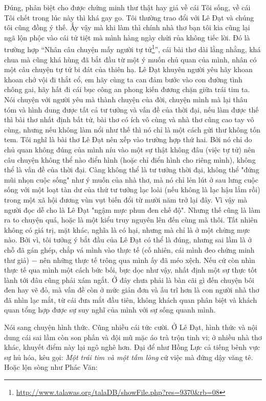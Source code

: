 \documentclass[../main.tex]{subfiles}
\begin{document}
\begin{multicols}{2}
Đúng, phân biệt cho được chứng minh thư thật hay giả về cái Tôi sống, về cái Tôi chết trong lúc này thì khá gay go. Tôi thường trao đổi với Lê Đạt và chúng tôi cũng đồng ý thế. Ấy vậy mà khi làm thì chính nhà thơ bạn tôi kia cũng lại ngã lộn phộc vào cái tử tiệt mà mình hàng ngày chửi rủa không tiếc lời. Đó là trường hợp “Nhân câu chuyện mấy người tự tử\footnote{\url{http://www.talawas.org/talaDB/showFile.php?res=9370&rb=08}}”, cái bài thơ dài lằng nhằng, khá chua mà cũng khá hùng đã bắt đầu từ một ý muốn chủ quan của mình, nhân có một câu chuyện tự tử bi đát của thiên hạ. Lê Đạt khuyên người yêu hãy khoan khoan chớ vội đi thắt cổ, em hãy cùng ta can đảm bước vào con đường tình chông gai, hãy hất đi cái bục công an phong kiến đương chặn giữa trái tim ta. Nói chuyện với người yêu mà thành chuyện của đời, chuyện mình mà lại thâu tóm và hình dung được tất cả tư tưởng và vấn đề của thời đại, nếu làm được thế thì bài thơ nhất định bất tử, bài thơ có ích vô cùng và nhà thơ cũng cao tay vô cùng, nhưng nếu không làm nổi như thế thì nó chỉ là một cách gửi thư không tốn tem. Tôi nghĩ là bài thơ Lê Đạt nên xếp vào trường hợp thứ hai. Bởi nó chỉ do chủ quan không đúng của mình níu vào một sự thật không đâu (việc tự tử) nên câu chuyện không thể nào điển hình (hoặc chỉ điển hình cho riêng mình), không thể là vấn đề của thời đại. Càng không thể là tư tưởng thời đại, không thể "đứng mũi nhọn cuộc sống" như ý muốn của nhà thơ, mà nó chỉ lẻn lút ở sau lưng cuộc sống với một loạt tàn dư của thứ tư tưởng lạc loài (nếu không là lạc hậu lắm rồi) trong một xã hội đương vùn vụt biến đổi từ mười năm trở lại đây. Vì vậy mà người đọc dễ cho là Lê Đạt "ngậm mực phun đen chế độ". Nhưng thế cũng là làm ra to chuyện quá, hoặc là một kiểu truy nguyên lên đến cùng mà thôi. Tất nhiên không có giá trị, mặt khác, nghĩa là có hại, nhưng mà chỉ là ở một chừng mực nào. Bởi vì, tôi tưởng ý bắt đầu của Lê Đạt có thể là đúng, nhưng sai lầm là ở chỗ đã gán ghép, chắp vá mình vào thực tế (cố nhiên, cái mình đeo chứng minh thư giả) − nên những thực tế trông qua mình ấy đã méo xệch. Nếu cứ còn nhìn thực tế qua mình một cách bức bối, bực dọc như vậy, nhất định một sự thực tốt lành tới đâu cũng phải xám ngắt. Ở đây chưa phải là bàn cãi gì đến chuyện bôi đen hay vẽ đỏ, mà vấn đề còn ở mức giản đơn và ấu trĩ hơn là con người nhà thơ đã nhìn lạc mắt, từ cái đưa mắt đầu tiên, không khách quan phân biệt và khách quan tổng hợp được sự suy nghĩ của mình với sự sống quanh mình. 
 
Nói sang chuyện hình thức. Cũng nhiều cái tức cười. Ở Lê Đạt, hình thức và nội dung cái sai lầm còn son phấn và đội mũ mặc áo trà trộn tinh vi; ở nhiều nhà thơ khác, khuyết điểm này lại ngô nghê hơn. Đại để như Hồng Lực cả tiếng bênh vực sự hủ hóa, kêu gọi: \textit{Một trái tim và một tấm lòng }cứ việc mà đứng dậy văng tê. Hoặc lộn sòng như Phác Văn:         
\begin{blockquote}
        

\end{blockquote}
\end{multicols}
\end{document}
